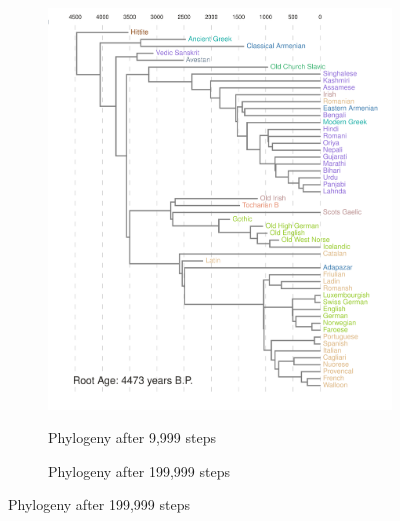 \documentclass[10pt,journal,compsoc]{IEEEtran}
\begin{document}


\begin{figure}
     \centering
     \begin{subfigure}[b]{0.4\paperwidth}
         \centering
         \caption{Phylogeny after 9,999 steps}
         \includegraphics[width=\textwidth]{runs26-conv1}
         \label{fig:convtree1}
     \end{subfigure}
     \hfill
     \begin{subfigure}[b]{0.4\paperwidth}
         \centering
         \caption{Phylogeny after 199,999 steps}

\end{subfigure}
\end{figure}
\end{document}
